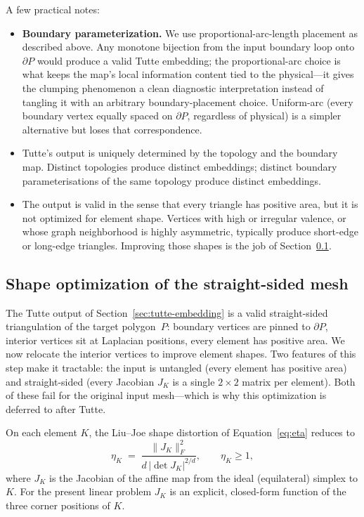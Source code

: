 \documentclass[11pt]{article}
\begin{document}
A few practical notes:
\begin{itemize}
  \item \textbf{Boundary parameterization.} We use
    proportional-arc-length placement as described above. Any
    monotone bijection from the input boundary loop
    onto $\partial P$ would produce a valid Tutte embedding;
    the proportional-arc choice is what keeps the map's local
    information content tied to the physical---it gives the
    clumping phenomenon a clean diagnostic interpretation
    instead of tangling it with an arbitrary boundary-placement
    choice. Uniform-arc (every boundary vertex equally spaced
    on $\partial P$, regardless of physical) is a simpler
    alternative but loses that correspondence.
  \item Tutte's output is uniquely determined by the topology and
    the boundary map. Distinct topologies produce distinct
    embeddings; distinct boundary parameterisations of the same
    topology produce distinct embeddings.
  \item The output is valid in the sense that every triangle has
    positive area, but it is not optimized for element shape.
    Vertices with high or irregular valence, or whose graph
    neighborhood is highly asymmetric, typically produce
    short-edge or long-edge triangles. Improving those shapes is
    the job of Section~\ref{sec:tutte-shape}.
\end{itemize}

\subsection{Shape optimization of the straight-sided mesh}
\label{sec:tutte-shape}

The Tutte output of Section~\ref{sec:tutte-embedding} is a valid
straight-sided triangulation of the target polygon~$P$: boundary
vertices are pinned to $\partial P$, interior vertices sit at
Laplacian positions, every element has positive area. We now
relocate the interior vertices to improve element shapes. Two
features of this step make it tractable: the input is untangled
(every element has positive area) and straight-sided (every Jacobian
$J_K$ is a single $2 \times 2$ matrix per element). Both of these
fail for the original input mesh---which is why this optimization is
deferred to after Tutte.

On each element $K$, the Liu--Joe shape distortion of
Equation~\eqref{eq:eta} reduces to
\begin{equation}
  \eta_K \;=\; \frac{\|J_K\|_F^2}{d\, |\det J_K|^{2/d}},
  \qquad \eta_K \ge 1,
\end{equation}
where $J_K$ is the Jacobian of the affine map from the ideal
(equilateral) simplex to $K$. For the present linear problem
$J_K$ is an explicit, closed-form function of the three corner
positions of $K$.
\end{document}
